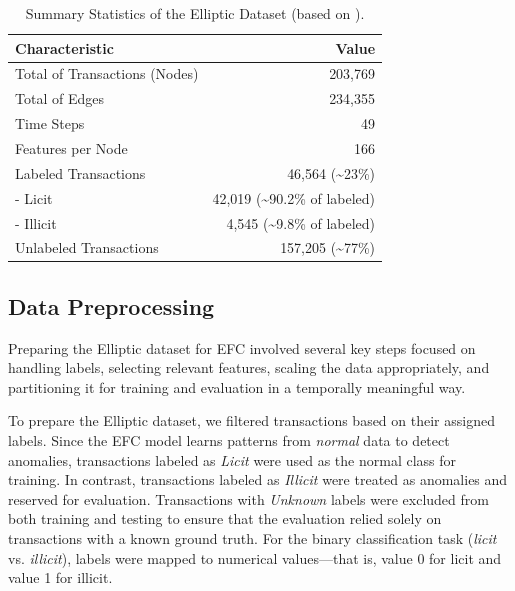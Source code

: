 \documentclass[12pt]{article}
\begin{document}
\begin{table}[htbp]
  \centering
  \caption{Summary Statistics of the Elliptic Dataset (based on \cite{weber2019antimoneylaunderingbitcoinexperimenting}).}
  \label{tab:dataset_summary}
  \begin{small}
  \begin{tabular}{lr}\toprule
    Characteristic        & Value \\ \midrule
    Total of Transactions (Nodes) & 203,769 \\
    Total of Edges           & 234,355 \\
    Time Steps            & 49 \\
    Features per Node     & 166 \\
    Labeled Transactions  & 46,564 (\textasciitilde23\%) \\
    \quad - Licit         & 42,019 (\textasciitilde90.2\% of labeled) \\
    \quad - Illicit       & 4,545 (\textasciitilde9.8\% of labeled) \\
    Unlabeled Transactions & 157,205 (\textasciitilde77\%) \\ \bottomrule
  \end{tabular}
  \end{small}
\end{table}

\subsection{Data Preprocessing} \label{subsec:preprocessing}
Preparing the Elliptic dataset for EFC involved several key steps focused on handling labels, selecting relevant features,
scaling the data appropriately, and partitioning it for training and evaluation in a temporally meaningful way.

To prepare the Elliptic dataset, we filtered transactions based on their assigned labels. Since the
EFC model learns patterns from \textit{normal} data to detect anomalies, transactions labeled as \textit{Licit} were used
as the normal class for training. In contrast, transactions labeled as \textit{Illicit} were treated as anomalies and
reserved for evaluation. Transactions with \textit{Unknown} labels were excluded from both training and testing to ensure
that the evaluation relied solely on transactions with a known ground truth. For the binary classification task (\textit{licit} vs.
\textit{illicit}), labels were mapped to numerical values---that is, value 0 for licit and value 1 for illicit.
\end{document}
